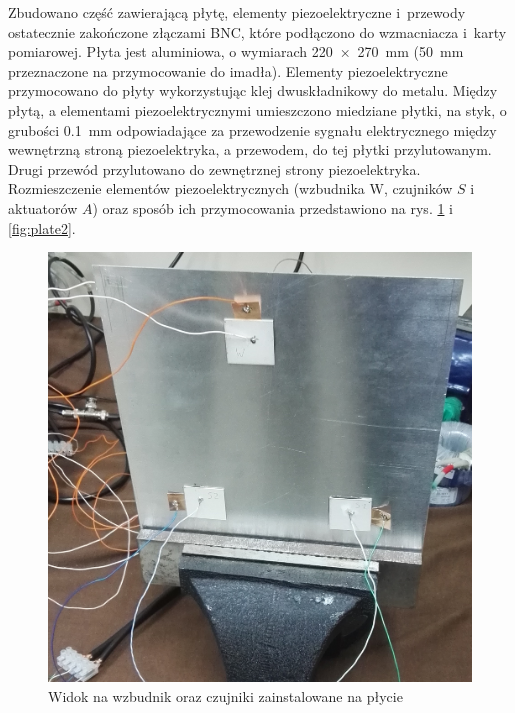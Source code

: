 \documentclass[polish,a4paper,11pt]{mwart}
\begin{document}
Zbudowano część zawierającą płytę, elementy piezoelektryczne i~przewody
ostatecznie zakończone złączami BNC, które podłączono do wzmacniacza i~karty
pomiarowej.  Płyta jest aluminiowa, o wymiarach \SI{220 x 270}{\milli\meter}
(\SI{50}{\milli\meter}
przeznaczone na przymocowanie do imadła). Elementy piezoelektryczne
przymocowano do płyty wykorzystując klej dwuskładnikowy do metalu. Między
płytą, a elementami piezoelektrycznymi umieszczono miedziane płytki, na styk, o
grubości \SI{0.1}{\milli\meter} odpowiadające za przewodzenie sygnału elektrycznego między
wewnętrzną stroną piezoelektryka, a przewodem, do tej płytki przylutowanym.
Drugi przewód przylutowano do zewnętrznej strony piezoelektryka. Rozmieszczenie
elementów piezoelektrycznych (wzbudnika W, czujników $S$ i aktuatorów $A$) oraz
sposób ich przymocowania przedstawiono na rys. \ref{fig:plate1} i
\ref{fig:plate2}.

\begin{figure}[!tbh]
  \centering
  \includegraphics[width=\textwidth]{./bitgraphics/plate1.jpg}
  \caption{Widok na wzbudnik oraz czujniki zainstalowane na płycie}
  \label{fig:plate1}
\end{figure}
\end{document}

